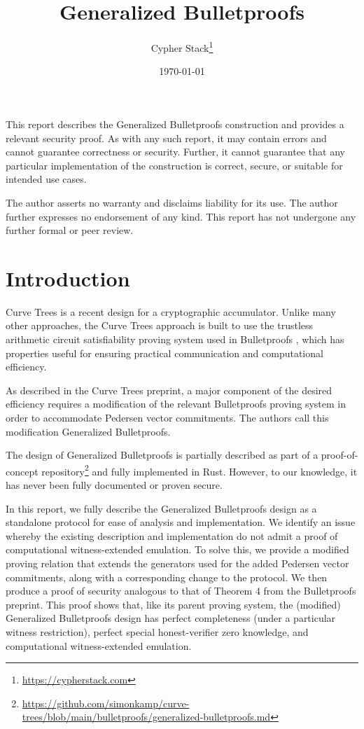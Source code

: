 \documentclass{article}
\title{Generalized Bulletproofs}
\author{Cypher Stack\thanks{\url{https://cypherstack.com}}}
\date{\today}
\begin{document}
\maketitle

This report describes the Generalized Bulletproofs construction and provides a relevant security proof.
As with any such report, it may contain errors and cannot guarantee correctness or security.
Further, it cannot guarantee that any particular implementation of the construction is correct, secure, or suitable for intended use cases.

The author asserts no warranty and disclaims liability for its use.
The author further expresses no endorsement of any kind.
This report has not undergone any further formal or peer review.

\tableofcontents


\section{Introduction}

Curve Trees \cite{curvetrees} is a recent design for a cryptographic accumulator.
Unlike many other approaches, the Curve Trees approach is built to use the trustless arithmetic circuit satisfiability proving system used in Bulletproofs \cite{bp}, which has properties useful for ensuring practical communication and computational efficiency.

As described in the Curve Trees preprint, a major component of the desired efficiency requires a modification of the relevant Bulletproofs proving system in order to accommodate Pedersen vector commitments.
The authors call this modification Generalized Bulletproofs.

The design of Generalized Bulletproofs is partially described as part of a proof-of-concept repository\footnote{\url{https://github.com/simonkamp/curve-trees/blob/main/bulletproofs/generalized-bulletproofs.md}} and fully implemented in Rust.
However, to our knowledge, it has never been fully documented or proven secure.

In this report, we fully describe the Generalized Bulletproofs design as a standalone protocol for ease of analysis and implementation.
We identify an issue whereby the existing description and implementation do not admit a proof of computational witness-extended emulation.
To solve this, we provide a modified proving relation that extends the generators used for the added Pedersen vector commitments, along with a corresponding change to the protocol.
We then produce a proof of security analogous to that of Theorem 4 from the Bulletproofs preprint.
This proof shows that, like its parent proving system, the (modified) Generalized Bulletproofs design has perfect completeness (under a particular witness restriction), perfect special honest-verifier zero knowledge, and computational witness-extended emulation.
\end{document}
